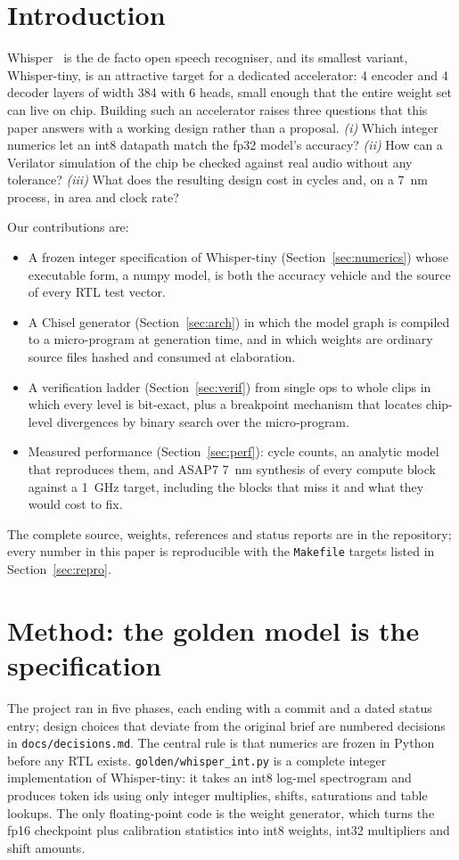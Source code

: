 \documentclass[conference]{IEEEtran}
\newcommand{\code}[1]{\texttt{#1}}
\begin{document}
\section{Introduction}
Whisper~\cite{whisper} is the de facto open speech recogniser, and its smallest variant, Whisper-tiny, is an attractive target for a dedicated accelerator: 4 encoder and 4 decoder layers of width 384 with 6 heads, small enough that the entire weight set can live on chip. Building such an accelerator raises three questions that this paper answers with a working design rather than a proposal. \emph{(i)} Which integer numerics let an int8 datapath match the fp32 model's accuracy? \emph{(ii)} How can a Verilator simulation of the chip be checked against real audio without any tolerance? \emph{(iii)} What does the resulting design cost in cycles and, on a \SI{7}{nm} process, in area and clock rate?

Our contributions are:
\begin{itemize}
\item A frozen integer specification of Whisper-tiny (Section~\ref{sec:numerics}) whose executable form, a numpy model, is both the accuracy vehicle and the source of every RTL test vector.
\item A Chisel generator (Section~\ref{sec:arch}) in which the model graph is compiled to a micro-program at generation time, and in which weights are ordinary source files hashed and consumed at elaboration.
\item A verification ladder (Section~\ref{sec:verif}) from single ops to whole clips in which every level is bit-exact, plus a breakpoint mechanism that locates chip-level divergences by binary search over the micro-program.
\item Measured performance (Section~\ref{sec:perf}): cycle counts, an analytic model that reproduces them, and ASAP7 \SI{7}{nm} synthesis of every compute block against a \SI{1}{GHz} target, including the blocks that miss it and what they would cost to fix.
\end{itemize}
The complete source, weights, references and status reports are in the repository; every number in this paper is reproducible with the \code{Makefile} targets listed in Section~\ref{sec:repro}.

\section{Method: the golden model is the specification}
The project ran in five phases, each ending with a commit and a dated status entry; design choices that deviate from the original brief are numbered decisions in \code{docs/decisions.md}. The central rule is that numerics are frozen in Python before any RTL exists. \code{golden/whisper\_int.py} is a complete integer implementation of Whisper-tiny: it takes an int8 log-mel spectrogram and produces token ids using only integer multiplies, shifts, saturations and table lookups. The only floating-point code is the weight generator, which turns the fp16 checkpoint plus calibration statistics into int8 weights, int32 multipliers and shift amounts.
\end{document}
